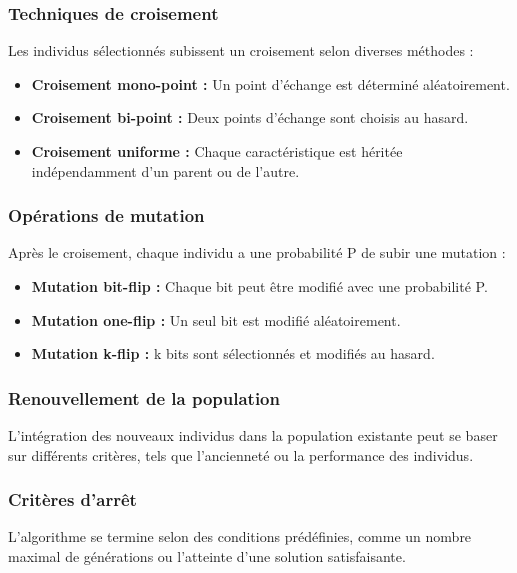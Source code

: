 \documentclass{article}
\begin{document}
\subsubsection{Techniques de croisement}

Les individus sélectionnés subissent un croisement selon diverses méthodes :

\begin{itemize}
    \item \textbf{Croisement mono-point :} Un point d'échange est déterminé aléatoirement.
    \item \textbf{Croisement bi-point :} Deux points d'échange sont choisis au hasard.
    \item \textbf{Croisement uniforme :} Chaque caractéristique est héritée indépendamment d'un parent ou de l'autre.
\end{itemize}

\subsubsection{Opérations de mutation}

Après le croisement, chaque individu a une probabilité P de subir une mutation :

\begin{itemize}
    \item \textbf{Mutation bit-flip :} Chaque bit peut être modifié avec une probabilité P.
    \item \textbf{Mutation one-flip :} Un seul bit est modifié aléatoirement.
    \item \textbf{Mutation k-flip :} k bits sont sélectionnés et modifiés au hasard.
\end{itemize}

\subsubsection{Renouvellement de la population}

L'intégration des nouveaux individus dans la population existante peut se baser sur différents critères, tels que l'ancienneté ou la performance des individus.

\subsubsection{Critères d'arrêt}

L'algorithme se termine selon des conditions prédéfinies, comme un nombre maximal de générations ou l'atteinte d'une solution satisfaisante.
\end{document}
